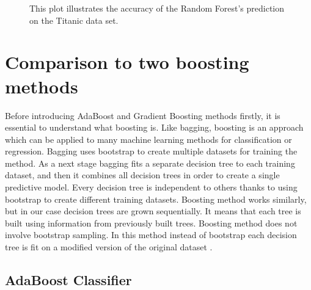 \begin{figure}[H]
    \captionsetup{format=plain}
    \caption
        {This plot illustrates the accuracy of the Random Forest's prediction on the Titanic data set.
        }
    \label{fig:confusion_matrix}
\end{figure}


\section{Comparison to two boosting methods}
Before introducing AdaBoost and Gradient Boosting methods firstly, it is essential to understand what boosting is. Like bagging, boosting is an approach which can be applied to many machine learning methods for classification or regression. Bagging uses bootstrap to create multiple datasets for training the method. As a next stage bagging fits a separate decision tree to each training dataset, and then it combines all decision trees in order to create a single predictive model. Every decision tree is independent to others thanks to using bootstrap to create different training datasets. Boosting method works similarly, but in our case decision trees are grown sequentially. It means that each tree is built using information from previously built trees. Boosting method does not involve bootstrap sampling. In this method instead of bootstrap each decision tree is fit on a modified version of the original dataset \cite{James2013}.

\subsection{AdaBoost Classifier}
\label{sec:adaboost}

